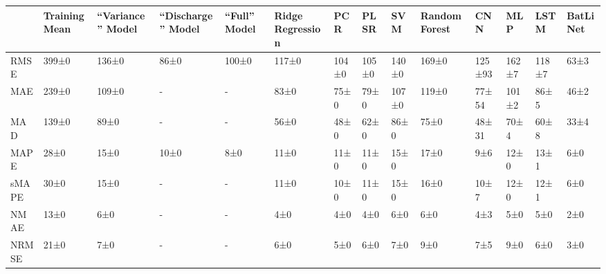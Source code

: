 \begin{tabular}{llllllllllllll}
\toprule
 & Training Mean & ``Variance'' Model & ``Discharge'' Model & ``Full'' Model & Ridge Regression & PCR & PLSR & SVM & Random Forest & CNN & MLP & LSTM & BatLiNet \\
\midrule
RMSE & 399±0 & 136±0 & 86±0 & 100±0 & 117±0 & 104±0 & 105±0 & 140±0 & 169±0 & 125±93 & 162±7 & 118±7 & 63±3 \\
MAE & 239±0 & 109±0 & - & - & 83±0 & 75±0 & 79±0 & 107±0 & 119±0 & 77±54 & 101±2 & 86±5 & 46±2 \\
MAD & 139±0 & 89±0 & - & - & 56±0 & 48±0 & 62±0 & 86±0 & 75±0 & 48±31 & 70±4 & 60±8 & 33±4 \\
MAPE & 28±0 & 15±0 & 10±0 & 8±0 & 11±0 & 11±0 & 11±0 & 15±0 & 17±0 & 9±6 & 12±0 & 13±1 & 6±0 \\
sMAPE & 30±0 & 15±0 & - & - & 11±0 & 10±0 & 11±0 & 15±0 & 16±0 & 10±7 & 12±0 & 12±1 & 6±0 \\
NMAE & 13±0 & 6±0 & - & - & 4±0 & 4±0 & 4±0 & 6±0 & 6±0 & 4±3 & 5±0 & 5±0 & 2±0 \\
NRMSE & 21±0 & 7±0 & - & - & 6±0 & 5±0 & 6±0 & 7±0 & 9±0 & 7±5 & 9±0 & 6±0 & 3±0 \\
\bottomrule
\end{tabular}

